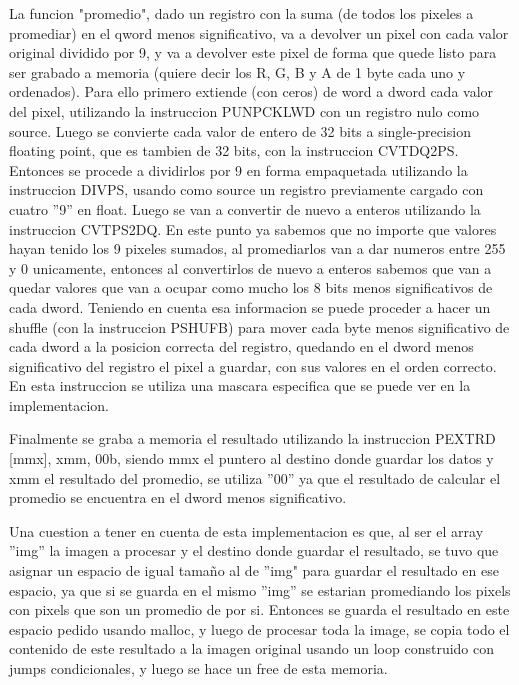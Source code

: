 \documentclass[a4paper]{article}
\begin{document}
La funcion "promedio", dado un registro con la suma (de todos los pixeles a promediar) en el qword menos significativo, va a devolver un pixel con cada valor original dividido por 9, y va a devolver este pixel de forma que quede listo para ser grabado a memoria (quiere decir los R, G, B y A de 1 byte cada uno y ordenados). Para ello primero extiende (con ceros) de word a dword cada valor del pixel, utilizando la instruccion PUNPCKLWD con un registro nulo como source. Luego se convierte cada valor de entero de 32 bits a single-precision floating point, que es tambien de 32 bits, con la instruccion CVTDQ2PS. Entonces se procede a dividirlos por 9 en forma empaquetada utilizando la instruccion DIVPS, usando como source un registro previamente cargado con cuatro ''9'' en float. Luego se van a convertir de nuevo a enteros utilizando la instruccion CVTPS2DQ. En este punto ya sabemos que no importe que valores hayan tenido los 9 pixeles sumados, al promediarlos van a dar numeros entre 255 y 0 unicamente, entonces al convertirlos de nuevo a enteros sabemos que van a quedar valores que van a ocupar como mucho los 8 bits menos significativos de cada dword. Teniendo en cuenta esa informacion se puede proceder a hacer un shuffle (con la instruccion PSHUFB) para mover cada byte menos significativo de cada dword a la posicion correcta del registro, quedando en el dword menos significativo del registro el pixel a guardar, con sus valores en el orden correcto. En esta instruccion se utiliza una mascara especifica que se puede ver en la implementacion.
\newline

Finalmente se graba a memoria el resultado utilizando la instruccion PEXTRD [mmx], xmm, 00b, siendo mmx el puntero al destino donde guardar los datos y xmm el resultado del promedio, se utiliza ''00'' ya que el resultado de calcular el promedio se encuentra en el dword menos significativo.
\newline

Una cuestion a tener en cuenta de esta implementacion es que, al ser el array ''img'' la imagen a procesar y el destino donde guardar el resultado, se tuvo que asignar un espacio de igual tamaño al de ''img" para guardar el resultado en ese espacio, ya que si se guarda en el mismo ''img''  se estarian promediando los pixels con pixels que son un promedio de por si. Entonces se guarda el resultado en este espacio pedido usando malloc, y luego de procesar toda la image, se copia todo el contenido de este resultado a la imagen original usando un loop construido con jumps condicionales, y luego se hace un free de esta memoria.
\newline
\end{document}
